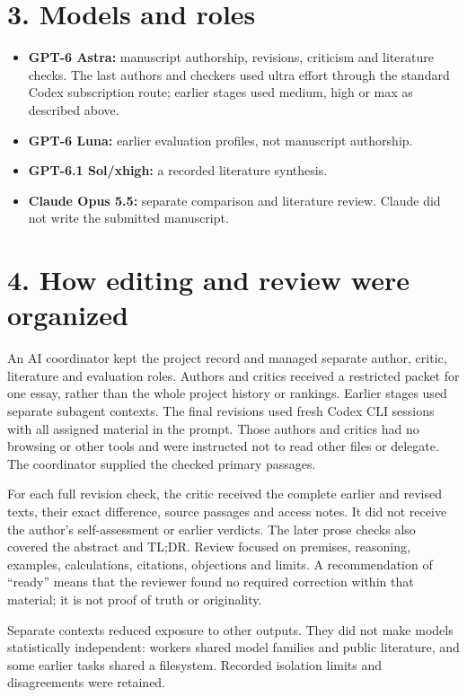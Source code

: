 \section*{3. Models and roles}

\begin{itemize}
\item \textbf{GPT-6 Astra:} manuscript authorship, revisions, criticism and literature checks. The last authors and checkers used ultra effort through the standard Codex subscription route; earlier stages used medium, high or max as described above.
\item \textbf{GPT-6 Luna:} earlier evaluation profiles, not manuscript authorship.
\item \textbf{GPT-6.1 Sol/xhigh:} a recorded literature synthesis.
\item \textbf{Claude Opus 5.5:} separate comparison and literature review. Claude did not write the submitted manuscript.
\end{itemize}

\section*{4. How editing and review were organized}

An AI coordinator kept the project record and managed separate author, critic, literature and evaluation roles. Authors and critics received a restricted packet for one essay, rather than the whole project history or rankings. Earlier stages used separate subagent contexts. The final revisions used fresh Codex CLI sessions with all assigned material in the prompt. Those authors and critics had no browsing or other tools and were instructed not to read other files or delegate. The coordinator supplied the checked primary passages.

For each full revision check, the critic received the complete earlier and revised texts, their exact difference, source passages and access notes. It did not receive the author's self-assessment or earlier verdicts. The later prose checks also covered the abstract and TL;DR. Review focused on premises, reasoning, examples, calculations, citations, objections and limits. A recommendation of “ready” means that the reviewer found no required correction within that material; it is not proof of truth or originality.

Separate contexts reduced exposure to other outputs. They did not make models statistically independent: workers shared model families and public literature, and some earlier tasks shared a filesystem. Recorded isolation limits and disagreements were retained.

